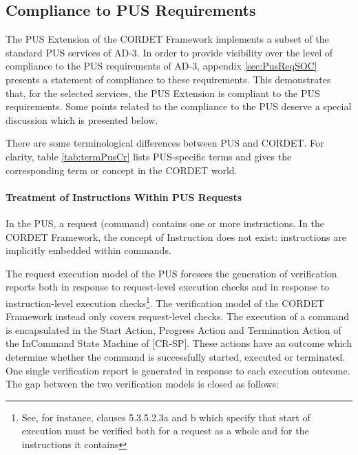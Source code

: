 \documentclass[a4paper,10pt]{article}
\begin{document}
\subsection{Compliance to PUS Requirements}\label{sec:ComplianceToPus}
The PUS Extension of the CORDET Framework implements a subset of the standard PUS services of AD-3. In order to provide visibility over the level of compliance to the PUS requirements of AD-3, appendix \ref{sec:PusReqSOC} presents a statement of compliance to these requirements. This demonstrates that, for the selected services, the PUS Extension is compliant to the PUS requirements. Some points related to the compliance to the PUS deserve a special discussion which is presented below. 

There are some terminological differences between PUS and CORDET. For clarity, table \ref{tab:termPusCr} lists PUS-specific terms and gives the corresponding term or concept in the CORDET world. 

\paragraph{Treatment of Instructions Within PUS Requests}
In the PUS, a request (command) contains one or more instructions. In the CORDET Framework, the concept of Instruction does not exist: instructions are implicitly embedded within commands. 

The request execution model of the PUS foresees the generation of verification reports both in response to request-level execution checks and in response to instruction-level execution checks\footnote{See, for instance, clauses 5.3.5.2.3a and b which specify that start of execution must be verified both for a request as a whole and for the instructions it contains}. The verification model of the CORDET Framework instead only covers request-level checks. The execution of a command is encapsulated in the Start Action, Progress Action and Termination Action of the InCommand State Machine of [CR-SP]. These actions have an outcome which determine whether the command is successfully started, executed or terminated. One single verification report is generated in response to each execution outcome. The gap between the two verification models is closed as follows:
\end{document}
